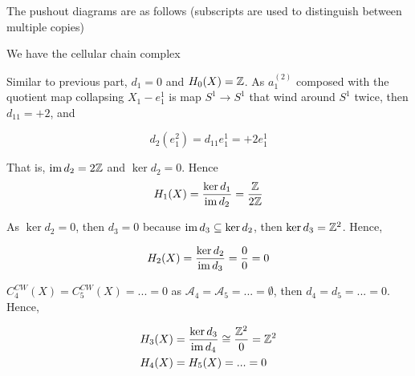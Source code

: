 \documentclass{article}
\begin{document}
The pushout diagrams are as follows (subscripts are used to distinguish between multiple copies)

\begin{center}
\end{center}

We have the cellular chain complex

\begin{center}
\end{center}

Similar to previous part, $d_1 = 0$ and $H_0(X) = \mathbb{Z}$. As $a^{(2)}_1$ composed with the quotient map collapsing $X_1 - e^1_1$ is map $S^1 \to S^1$ that wind around $S^1$ twice, then $d_{1 1} = +2$, and

$$
    d_2(e^2_1) = d_{1 1} e^1_1 = +2 e^1_1
$$

That is, $\operatorname{im} d_2 = 2\mathbb{Z}$ and $\ker d_2 = 0$. Hence
$$
    H_1(X) = \frac{\ker d_1}{\operatorname{im} d_2} = \frac{\mathbb{Z}}{2\mathbb{Z}}
$$

As $\ker d_2 = 0$, then $d_3 = 0$ because $\operatorname{im} d_3 \subseteq \ker d_2$, then $\ker d_3 = \mathbb{Z}^2$. Hence,

$$
    H_2(X) = \frac{\ker d_2}{\operatorname{im} d_3} = \frac{0}{0} = 0
$$

$C^{CW}_4(X) = C^{CW}_5(X) = ... = 0$  as $\mathcal{A}_4 = \mathcal{A}_5 = ... = \emptyset$, then $d_4 = d_5 = ... = 0$. Hence,

\begin{align*}
    H_3(X) &= \frac{\ker d_3}{\operatorname{im} d_4} \cong \frac{\mathbb{Z}^2}{0} = \mathbb{Z}^2 \\
    H_4(X) &= H_5(X) = ... = 0
\end{align*}
\end{document}
